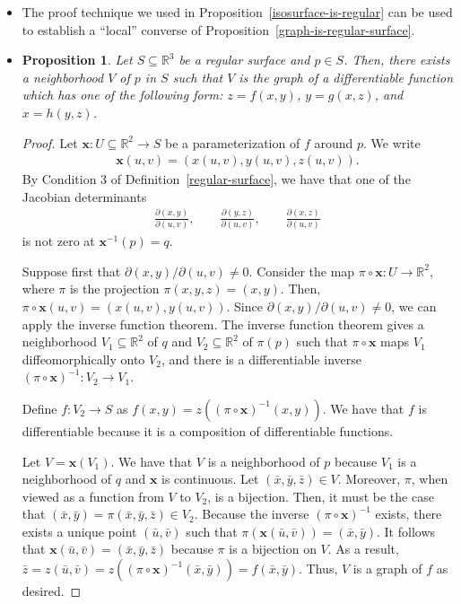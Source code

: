 \documentclass[10pt]{article}
\newtheorem{proposition}[lemma]{Proposition}
\newcommand{\ve}[1]{\mathbf{#1}}
\newcommand{\ra}{\rightarrow}
\newcommand{\Real}{\mathbb{R}}
\newcommand{\sseq}{\subseteq}
\begin{document}
  \begin{itemize}
    \item The proof technique we used in Proposition~\ref{isosurface-is-regular} can be used to establish a ``local'' converse of Proposition~\ref{graph-is-regular-surface}.

    \item \begin{proposition} \label{regular-surface-is-graph}
      Let $S \sseq \Real^3$ be a regular surface and $p \in S$. Then, there exists a neighborhood $V$ of $p$ in $S$ such that $V$ is the graph of a differentiable function which has one of the following form: $z = f(x,y)$, $y = g(x,z)$, and $x = h(y,z)$.      
    \end{proposition}

    \begin{proof}
      Let $\ve{x} : U \sseq \Real^2 \ra S$ be a parameterization of $f$ around $p$. We write
      \begin{align*}
        \ve{x}(u,v) = (x(u,v), y(u,v), z(u,v)).
      \end{align*}
      By Condition 3 of Definition~\ref{regular-surface}, we have that one of the Jacobian determinants
      \begin{align*}
        \frac{\partial(x,y)}{\partial(u,v)}, \qquad \frac{\partial(y,z)}{\partial(u,v)}, \qquad \frac{\partial(x,z)}{\partial(u,v)}
      \end{align*}
      is not zero at $\ve{x}^{-1}(p) = q$.

      Suppose first that $\partial(x,y)/\partial(u,v) \neq 0$. Consider the map $\pi \circ \ve{x} : U \ra \Real^2$, where $\pi$ is the projection $\pi(x,y,z) = (x,y)$. Then, $\pi \circ \ve{x}(u,v) = (x(u,v), y(u,v)).$ Since $\partial(x,y)/\partial(u,v) \neq 0$, we can apply the inverse function theorem. The inverse function theorem gives a neighborhood $V_1 \sseq \Real^2$ of $q$ and $V_2 \sseq \Real^2$ of $\pi(p)$ such that $\pi \circ \ve{x}$ maps $V_1$ diffeomorphically onto $V_2$, and there is a differentiable inverse $(\pi \circ \ve{x})^{-1} : V_2 \ra V_1$.
      
      Define $f : V_2 \ra S$ as $f(x,y) = z((\pi \circ \ve{x})^{-1}(x,y))$. We have that $f$ is differentiable because it is a composition of differentiable functions.

      Let $V = \ve{x}(V_1)$. We have that $V$ is a neighborhood of $p$ because $V_1$ is a neighborhood of $q$ and $\ve{x}$ is continuous. Let $(\bar x, \bar y, \bar z) \in V$. Moreover, $\pi$, when viewed as a function from $V$ to $V_2$, is a bijection. Then, it must be the case that $(\bar x, \bar y) = \pi(\bar x, \bar y, \bar z) \in V_2$. Because the inverse $(\pi \circ \ve{x})^{-1}$ exists, there exists a unique point $(\bar u, \bar v)$ such that $\pi(\ve{x}(\bar u, \bar v)) = (\bar {x}, \bar {y})$. It follows that $\ve{x}(\bar u, \bar v) = (\bar x, \bar y, \bar z)$ because $\pi$ is a bijection on $V$. As a result, $\bar z = z(\bar u, \bar v) = z((\pi \circ \ve{x})^{-1}(\bar x, \bar y)) = f(\bar x, \bar y)$. Thus, $V$ is a graph of $f$ as desired.


\end{proof}
\end{itemize}
\end{document}
